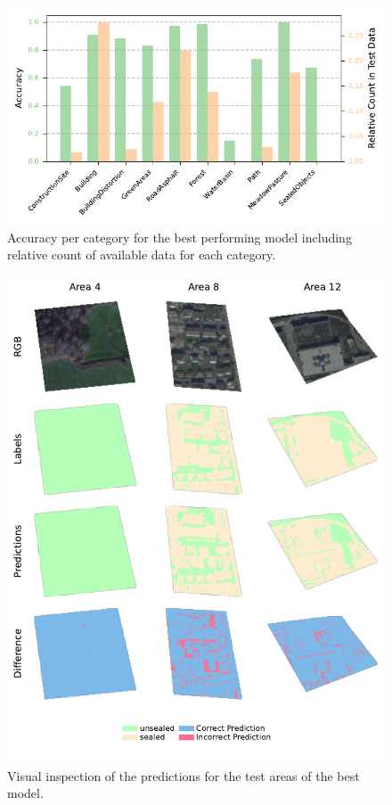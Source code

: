 \begin{figure}[H]
    \centering
    \captionsetup{width=0.8\linewidth}
    \includegraphics{figures/best_model_accuracy_per_category.pdf}
    \caption{Accuracy per category for the best performing model including relative count of available data for each category.}
    \label{fig:best_model_accuracy_per_category}
\end{figure}

\begin{figure}[H]
    \centering
    \captionsetup{width=0.8\linewidth}
    \includegraphics{figures/best_model_visual.pdf}
    \caption{Visual inspection of the predictions for the test areas of the best model.}
    \label{fig:best_model_visual}
\end{figure}